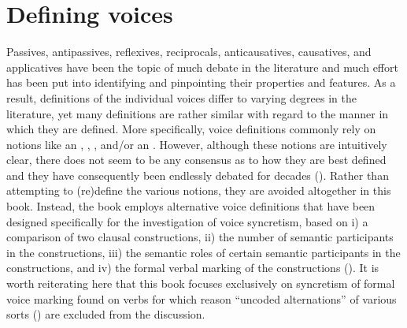 \chapter{Defining voices} \label{defining-voices}
Passives, antipassives, reflexives, reciprocals, anticausatives, causatives, and applicatives have been the topic of much debate in the literature and much effort has been put into identifying and pinpointing their properties and features. As a result, definitions of the individual voices differ to varying degrees in the literature, yet many definitions are rather similar with regard to the manner in which they are defined. More specifically, voice definitions commonly rely on notions like an , , , and/or an . However, although these notions are intuitively clear, there does not seem to be any consensus as to how they are best defined and they have consequently been endlessly debated for decades (). Rather than attempting to (re)define the various notions, they are avoided altogether in this book. Instead, the book employs alternative voice definitions that have been designed specifically for the investigation of voice syncretism, based on i) a comparison of two clausal constructions, ii) the number of semantic participants in the constructions, iii) the semantic roles of certain semantic participants in the constructions, and iv) the formal verbal marking of the constructions (). It is worth reiterating here that this book focuses exclusively on syncretism of formal voice marking found on verbs for which reason “uncoded alternations” of various sorts (\citealt[178ff.]{zuniga:kittila:2019}) are excluded from the discussion.

